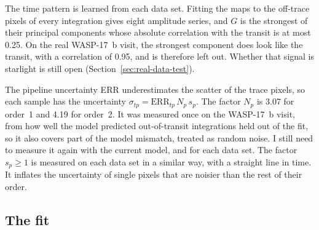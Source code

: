 The time pattern is learned from each data set. Fitting the maps to the
off-trace pixels of every integration gives eight amplitude series, and $G$
is the strongest of their principal components whose absolute correlation
with the transit is at most 0.25. On the real WASP-17~b visit, the strongest component
does look like the transit, with a correlation of 0.95, and is therefore left
out. Whether that signal is starlight is still open
(Section~\ref{sec:real-data-test}).

The pipeline uncertainty ERR underestimates the scatter of the trace pixels,
so each sample has the uncertainty
$\sigma_{tp}=\mathrm{ERR}_{tp}\,N_{p}\,s_{p}$. The factor $N_p$ is 3.07 for
order~1 and 4.19 for order~2. It was measured once on the WASP-17~b visit, from
how well the model predicted out-of-transit integrations held out of the fit,
so it also covers part of the model mismatch, treated as random noise. I still
need to measure it again with the current model, and for each data set. The factor
$s_p\geq1$ is measured on each data set in a similar way, with a straight line
in time. It inflates the uncertainty of single pixels that are noisier than the
rest of their order.

\subsection{The fit}
\label{sec:fit}

